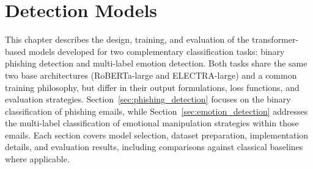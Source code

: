\chapter{Detection Models}
\label{chapter:model}

This chapter describes the design, training, and evaluation of the transformer-based models developed for two complementary classification tasks: binary phishing detection and multi-label emotion detection. Both tasks share the same two base architectures (\acs{RoBERTa}-large and \acs{ELECTRA}-large) and a common training philosophy, but differ in their output formulations, loss functions, and evaluation strategies. Section~\ref{sec:phishing_detection} focuses on the binary classification of phishing emails, while Section~\ref{sec:emotion_detection} addresses the multi-label classification of emotional manipulation strategies within those emails. Each section covers model selection, dataset preparation, implementation details, and evaluation results, including comparisons against classical baselines where applicable.

